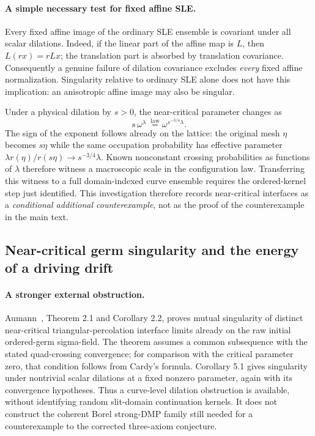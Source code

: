 \documentclass[11pt]{article}
\theoremstyle{definition}\newtheorem{definition}[theorem]{Definition}
\theoremstyle{remark}\newtheorem{remark}[theorem]{Remark}
\begin{document}
\paragraph{A simple necessary test for fixed affine SLE.}
Every fixed affine image of the ordinary SLE ensemble is covariant under
all scalar dilations.  Indeed, if the linear part of the affine map is $L$,
then $L(rx)=rLx$; the translation part is absorbed by translation covariance.
Consequently a genuine failure of dilation covariance excludes \emph{every}
fixed affine normalization.  Singularity relative to ordinary SLE alone does
not have this implication: an anisotropic affine image may also be singular.

Under a physical dilation by $s>0$, the near-critical parameter changes as
\[
 s\,\omega^{\lambda}\ \stackrel{\mathrm{law}}{=}
 \omega^{s^{-3/4}\lambda}.
\]
The sign of the exponent follows already on the lattice: the original mesh
$\eta$ becomes $s\eta$ while the same occupation probability has effective
parameter $\lambda r(\eta)/r(s\eta)\to s^{-3/4}\lambda$.  Known nonconstant
crossing probabilities as functions of $\lambda$ therefore witness a
macroscopic scale in the configuration law.  Transferring this witness to
a full domain-indexed curve ensemble requires the ordered-kernel step just
identified.  This investigation therefore records near-critical interfaces
as a \emph{conditional additional counterexample}, not as the proof of the
counterexample in the main text.

\subsection{Near-critical germ singularity and the energy of a driving drift}
\label{sec:germ-energy}

\paragraph{A stronger external obstruction.}
Aumann~\cite{aumann}, Theorem 2.1 and Corollary 2.2, proves mutual
singularity of distinct near-critical triangular-percolation interface
limits already on the raw initial ordered-germ sigma-field. The theorem
assumes a common subsequence with the stated quad-crossing convergence;
for comparison with the critical parameter zero, that condition follows
from Cardy's formula. Corollary 5.1 gives singularity under nontrivial
scalar dilations at a fixed nonzero parameter, again with its convergence
hypotheses. Thus a curve-level dilation obstruction is available, without
identifying random slit-domain continuation kernels. It does not construct
the coherent Borel strong-DMP family still needed for a counterexample to
the corrected three-axiom conjecture.
\end{document}
